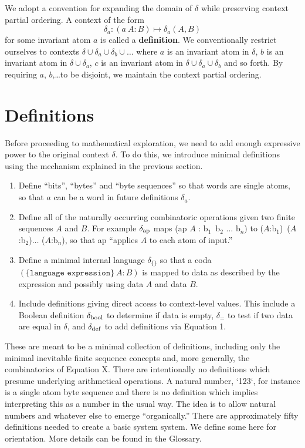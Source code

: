 \documentclass[11pt]{article}
\begin{document}
We adopt a convention for expanding the domain of $\delta$ while preserving context partial ordering. 
A context of the form 
\begin{equation}
	\delta_a: (a\ A:B) \mapsto \delta_a(A,B)
\end{equation}
for some invariant atom $a$ is called a {\bf definition}.  We conventionally restrict ourselves to 
contexts $\delta\cup\delta_a\cup\delta_b\cup\dots$ where $a$ is an invariant atom in $\delta$, $b$ is an invariant atom in $\delta\cup\delta_a$, $c$ is an invariant atom in $\delta\cup\delta_a\cup\delta_b$ and so forth.  By requiring $a$, $b$,\dots to be disjoint, we maintain the context partial ordering.  

\section{Definitions}

     Before proceeding to mathematical exploration, we need to add enough expressive power to the original context $\delta$.  To do this, 
we introduce minimal definitions using the mechanism explained in the previous section.  

\begin{enumerate}
\item {Define ``bits'', ``bytes'' and ``byte sequences'' so that words are single atoms, so that $a$ can be a word in future definitions $\delta_a$.}
\item {Define all of the naturally occurring combinatoric operations given two finite sequences $A$ and $B$.  For example $\delta_{\rm ap}$
maps (ap $A$ : b$_1$\ b$_2$ $\dots$ b$_n$) to ($A$:b$_1$)\ ($A$:b$_2$)$\dots$ ($A$:b$_n$), so that ap ``applies $A$ to each atom of input.'' }
\item {Define a minimal internal language $\delta_{\{\}}$ so that a coda $(\{\texttt{language expression}\}\ A : B)$ is mapped to data as described by 
the expression and possibly using data $A$ and data $B$.}
\item {Include definitions giving direct access to context-level values.  This include a Boolean definition $\delta_{\rm bool}$ to determine if data is empty, 
$\delta_{=}$ to test if two data are equal in $\delta$, and $\delta_{\rm def}$ to add definitions via Equation 1.} 
\end{enumerate}
These are meant to be a minimal collection of definitions, including only the minimal inevitable finite sequence concepts and, more generally, 
the combinatorics of Equation X.  There are intentionally no definitions which presume underlying arithmetical operations.  A natural number, 
`123`, for instance is a single atom byte sequence and there is no definition which implies interpreting this as a number in the usual way.  The idea is
to allow natural numbers and whatever else to emerge ``organically.'' 
There are approximately fifty definitions needed to create a basic system system.  We define some here for orientation.  More details can be found in the Glossary.  
\end{document}
